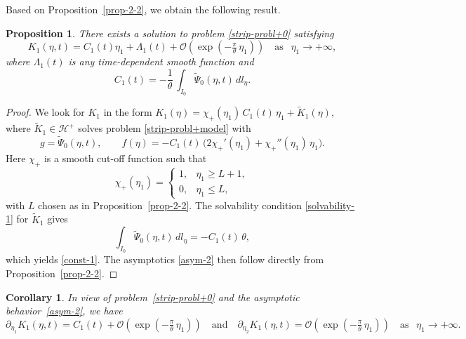 \documentclass[reqno]{amsart}            %
\newtheorem{corollary}{Corollary}[section]
\newtheorem{proposition}{Proposition}[section]
\numberwithin{equation}{section}
\begin{document}
	Based on Proposition~\ref{prop-2-2}, we obtain the following result.
	\begin{proposition}\label{prop-2-3}
		There exists a solution to problem \eqref{strip-probl+0}  satisfying
		\begin{equation}\label{asym-2}
			K_1(\eta,t) = C_1(t) \eta_1 + \Lambda_1(t) + \mathcal{O}\!\left(\exp(- \tfrac{\pi}{\theta}\,  \eta_1)\right)
			\quad \text{as } \ \ \eta_1 \to +\infty,
		\end{equation}
		where $\Lambda_1(t)$ is any  time-dependent smooth  function and 
		\begin{equation}\label{const-1}
			C_1(t) = - \frac{1}{\theta} \, \int_{I_0} \widetilde{\varPsi}_0(\eta,t)\, dl_\eta .
		\end{equation}
	\end{proposition}
	\begin{proof}
		We look for $K_1$ in the form
		$
		K_1(\eta) = \chi_+(\eta_1)\, C_1(t)\, \eta_1 + \widetilde{K}_1(\eta),
		$
		where $\widetilde{K}_1 \in \mathcal{H}^+$ solves problem \eqref{strip-probl+model} with
		\[
		g = \widetilde{\varPsi}_0(\eta,t), \qquad
		f(\eta) = -C_1(t)\, \big(2\chi_+'(\eta_1) + \chi_+''(\eta_1)\,\eta_1\big).
		\]
		Here $\chi_+$ is a smooth cut-off function such that
		\[
		\chi_+(\eta_1)=
		\begin{cases}
			1, & \eta_1 \ge L+1,\\
			0, & \eta_1 \le L,
		\end{cases}
		\]
		with $L$ chosen as in Proposition~\ref{prop-2-2}.
		The solvability condition \eqref{solvability-1} for $\widetilde{K}_1$ gives
		\[
		\int_{I_0} \widetilde{\varPsi}_0(\eta,t)\, dl_\eta
		= - C_1(t)\, \theta,
		\]
		which yields \eqref{const-1}.  The asymptotics \eqref{asym-2} then follow directly from Proposition~\ref{prop-2-2}.
	\end{proof}
	\begin{corollary}
		In view of problem~\eqref{strip-probl+0} and the asymptotic behavior~\eqref{asym-2}, we have 
		\begin{equation*}%
			\partial_{\eta_1} K_1(\eta,t)
			= C_1(t) + \mathcal{O}\!\left(\exp(- \tfrac{\pi}{\theta}\,  \eta_1)\right) \quad \text{and} \quad 
			\partial_{\eta_2} K_1(\eta,t)
			= \mathcal{O}\!\left(\exp(- \tfrac{\pi}{\theta}\,  \eta_1)\right)
			\quad \text{as } \ \ \eta_1 \to +\infty.
		\end{equation*}
	\end{corollary}
	
\end{document}

